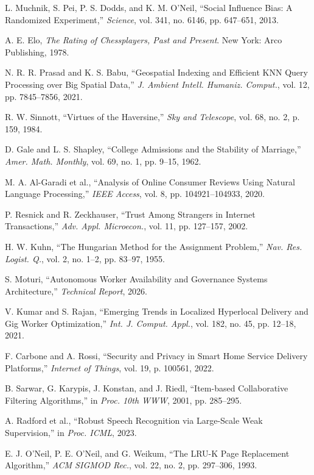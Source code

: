 \documentclass[10pt,twocolumn,a4paper]{article}
\begin{document}
\noindent
[5] L. Muchnik, S. Pei, P. S. Dodds, and K. M. O'Neil, ``Social Influence Bias: A Randomized Experiment,'' \textit{Science}, vol. 341, no. 6146, pp. 647--651, 2013.

\noindent
[6] A. E. Elo, \textit{The Rating of Chessplayers, Past and Present}. New York: Arco Publishing, 1978.

\noindent
[7] N. R. R. Prasad and K. S. Babu, ``Geospatial Indexing and Efficient KNN Query Processing over Big Spatial Data,'' \textit{J. Ambient Intell. Humaniz. Comput.}, vol. 12, pp. 7845--7856, 2021.

\noindent
[8] R. W. Sinnott, ``Virtues of the Haversine,'' \textit{Sky and Telescope}, vol. 68, no. 2, p. 159, 1984.

\noindent
[9] D. Gale and L. S. Shapley, ``College Admissions and the Stability of Marriage,'' \textit{Amer. Math. Monthly}, vol. 69, no. 1, pp. 9--15, 1962.

\noindent
[10] M. A. Al-Garadi et al., ``Analysis of Online Consumer Reviews Using Natural Language Processing,'' \textit{IEEE Access}, vol. 8, pp. 104921--104933, 2020.

\noindent
[11] P. Resnick and R. Zeckhauser, ``Trust Among Strangers in Internet Transactions,'' \textit{Adv. Appl. Microecon.}, vol. 11, pp. 127--157, 2002.

\noindent
[12] H. W. Kuhn, ``The Hungarian Method for the Assignment Problem,'' \textit{Nav. Res. Logist. Q.}, vol. 2, no. 1--2, pp. 83--97, 1955.

\noindent
[13] S. Moturi, ``Autonomous Worker Availability and Governance Systems Architecture,'' \textit{Technical Report}, 2026.

\noindent
[14] V. Kumar and S. Rajan, ``Emerging Trends in Localized Hyperlocal Delivery and Gig Worker Optimization,'' \textit{Int. J. Comput. Appl.}, vol. 182, no. 45, pp. 12--18, 2021.

\noindent
[15] F. Carbone and A. Rossi, ``Security and Privacy in Smart Home Service Delivery Platforms,'' \textit{Internet of Things}, vol. 19, p. 100561, 2022.

\noindent
[16] B. Sarwar, G. Karypis, J. Konstan, and J. Riedl, ``Item-based Collaborative Filtering Algorithms,'' in \textit{Proc. 10th WWW}, 2001, pp. 285--295.

\noindent
[17] A. Radford et al., ``Robust Speech Recognition via Large-Scale Weak Supervision,'' in \textit{Proc. ICML}, 2023.

\noindent
[18] E. J. O'Neil, P. E. O'Neil, and G. Weikum, ``The LRU-K Page Replacement Algorithm,'' \textit{ACM SIGMOD Rec.}, vol. 22, no. 2, pp. 297--306, 1993.
\end{document}
